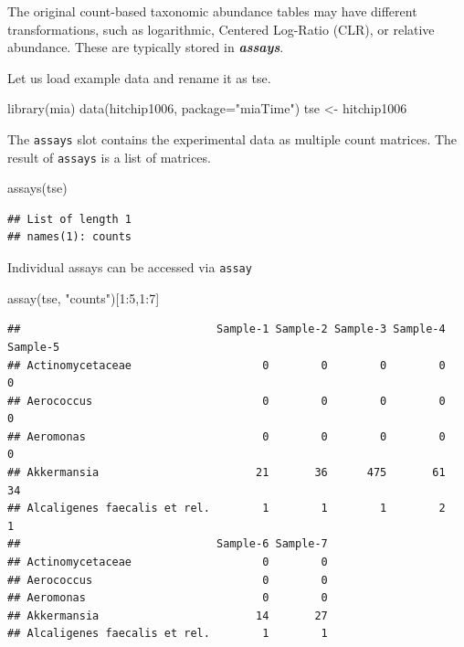 \documentclass[
]{book}
\newenvironment{Shaded}{\begin{snugshade}}{\end{snugshade}}
\newcommand{\AttributeTok}[1]{\textcolor[rgb]{0.77,0.63,0.00}{#1}}
\newcommand{\DecValTok}[1]{\textcolor[rgb]{0.00,0.00,0.81}{#1}}
\newcommand{\FunctionTok}[1]{\textcolor[rgb]{0.00,0.00,0.00}{#1}}
\newcommand{\NormalTok}[1]{#1}
\newcommand{\OtherTok}[1]{\textcolor[rgb]{0.56,0.35,0.01}{#1}}
\newcommand{\SpecialCharTok}[1]{\textcolor[rgb]{0.00,0.00,0.00}{#1}}
\newcommand{\StringTok}[1]{\textcolor[rgb]{0.31,0.60,0.02}{#1}}
\begin{document}
The original count-based taxonomic abundance tables may have different
transformations, such as logarithmic, Centered Log-Ratio (CLR), or relative
abundance. These are typically stored in \emph{\textbf{assays}}.

Let us load example data and rename it as tse.

\begin{Shaded}
\begin{Highlighting}[]
\FunctionTok{library}\NormalTok{(mia)}
\FunctionTok{data}\NormalTok{(hitchip1006, }\AttributeTok{package=}\StringTok{"miaTime"}\NormalTok{)}
\NormalTok{tse }\OtherTok{\textless{}{-}}\NormalTok{ hitchip1006}
\end{Highlighting}
\end{Shaded}

The \texttt{assays} slot contains the experimental data as multiple count matrices. The result of \texttt{assays} is a list of matrices.

\begin{Shaded}
\begin{Highlighting}[]
\FunctionTok{assays}\NormalTok{(tse)}
\end{Highlighting}
\end{Shaded}

\begin{verbatim}
## List of length 1
## names(1): counts
\end{verbatim}

Individual assays can be accessed via \texttt{assay}

\begin{Shaded}
\begin{Highlighting}[]
\FunctionTok{assay}\NormalTok{(tse, }\StringTok{"counts"}\NormalTok{)[}\DecValTok{1}\SpecialCharTok{:}\DecValTok{5}\NormalTok{,}\DecValTok{1}\SpecialCharTok{:}\DecValTok{7}\NormalTok{]}
\end{Highlighting}
\end{Shaded}

\begin{verbatim}
##                              Sample-1 Sample-2 Sample-3 Sample-4 Sample-5
## Actinomycetaceae                    0        0        0        0        0
## Aerococcus                          0        0        0        0        0
## Aeromonas                           0        0        0        0        0
## Akkermansia                        21       36      475       61       34
## Alcaligenes faecalis et rel.        1        1        1        2        1
##                              Sample-6 Sample-7
## Actinomycetaceae                    0        0
## Aerococcus                          0        0
## Aeromonas                           0        0
## Akkermansia                        14       27
## Alcaligenes faecalis et rel.        1        1
\end{verbatim}
\end{document}
